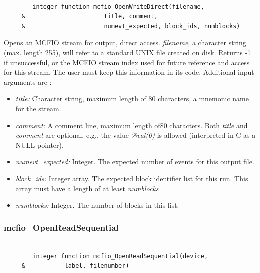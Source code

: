 \begin{verbatim}

        integer function mcfio_OpenWriteDirect(filename,
     &                      title, comment,
     &                      numevt_expected, block_ids, numblocks)

\end{verbatim}
 Opens an MCFIO stream for output, direct access. {\em filename}, a  character
 string (max. length 255), will refer to a  standard UNIX file created on
 disk. Returns -1 if unsuccessful, or the MCFIO stream index
 used for future reference and access for this stream. The user must keep
 this information in its code. Additional input arguments are :
\begin{itemize}
\item {\em title:} Character string, maximum length of 80 characters, a mnemonic name for the
stream.
\item {\em comment:} A comment line, maximum length of80 characters. Both {\em title }
and {\em comment} are optional, e.g., the value {\em \%val(0)} is allowed
(interpreted in C as a NULL pointer).
\item {\em numevt\_expected:} Integer.  The expected number of events for this
output  file.
\item {\em block\_ids:} Integer array. The expected block identifier list for
this run. This array must have a length of at least {\em numblocks}
\item {\em numblocks:} Integer. The number of blocks in this list.
\end{itemize}


\subsubsection{mcfio\_OpenReadSequential}

\begin{verbatim}

        integer function mcfio_OpenReadSequential(device,
     &           label, filenumber)

\end{verbatim}

